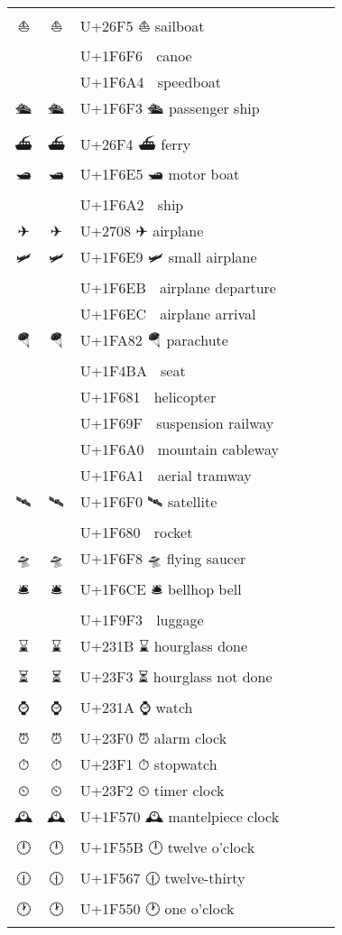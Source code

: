 \documentclass[a4paper,12pt]{ltjarticle}
\newcommand{\fontA}[1]{{\fontspec[RawFeature={mode=harf,+dist,+ccmp}]{Segoe UI Emoji} #1}}
\newcommand{\fontB}[1]{{\fontspec[RawFeature={mode=harf,+dist,+ccmp}]{Noto Color Emoji} #1}}
\begin{document}
\begin{longtable}[c]{ccp{0.8\linewidth}}
\fontA{⛵}&\fontB{⛵}&U+26F5 ⛵ sailboat\\
\fontA{🛶}&\fontB{🛶}&U+1F6F6 🛶 canoe\\
\fontA{🚤}&\fontB{🚤}&U+1F6A4 🚤 speedboat\\
\fontA{🛳}&\fontB{🛳}&U+1F6F3 🛳 passenger ship\\
\fontA{⛴}&\fontB{⛴}&U+26F4 ⛴ ferry\\
\fontA{🛥}&\fontB{🛥}&U+1F6E5 🛥 motor boat\\
\fontA{🚢}&\fontB{🚢}&U+1F6A2 🚢 ship\\
\fontA{✈}&\fontB{✈}&U+2708 ✈ airplane\\
\fontA{🛩}&\fontB{🛩}&U+1F6E9 🛩 small airplane\\
\fontA{🛫}&\fontB{🛫}&U+1F6EB 🛫 airplane departure\\
\fontA{🛬}&\fontB{🛬}&U+1F6EC 🛬 airplane arrival\\
\fontA{🪂}&\fontB{🪂}&U+1FA82 🪂 parachute\\
\fontA{💺}&\fontB{💺}&U+1F4BA 💺 seat\\
\fontA{🚁}&\fontB{🚁}&U+1F681 🚁 helicopter\\
\fontA{🚟}&\fontB{🚟}&U+1F69F 🚟 suspension railway\\
\fontA{🚠}&\fontB{🚠}&U+1F6A0 🚠 mountain cableway\\
\fontA{🚡}&\fontB{🚡}&U+1F6A1 🚡 aerial tramway\\
\fontA{🛰}&\fontB{🛰}&U+1F6F0 🛰 satellite\\
\fontA{🚀}&\fontB{🚀}&U+1F680 🚀 rocket\\
\fontA{🛸}&\fontB{🛸}&U+1F6F8 🛸 flying saucer\\
\fontA{🛎}&\fontB{🛎}&U+1F6CE 🛎 bellhop bell\\
\fontA{🧳}&\fontB{🧳}&U+1F9F3 🧳 luggage\\
\fontA{⌛}&\fontB{⌛}&U+231B ⌛ hourglass done\\
\fontA{⏳}&\fontB{⏳}&U+23F3 ⏳ hourglass not done\\
\fontA{⌚}&\fontB{⌚}&U+231A ⌚ watch\\
\fontA{⏰}&\fontB{⏰}&U+23F0 ⏰ alarm clock\\
\fontA{⏱}&\fontB{⏱}&U+23F1 ⏱ stopwatch\\
\fontA{⏲}&\fontB{⏲}&U+23F2 ⏲ timer clock\\
\fontA{🕰}&\fontB{🕰}&U+1F570 🕰 mantelpiece clock\\
\fontA{🕛}&\fontB{🕛}&U+1F55B 🕛 twelve o’clock\\
\fontA{🕧}&\fontB{🕧}&U+1F567 🕧 twelve-thirty\\
\fontA{🕐}&\fontB{🕐}&U+1F550 🕐 one o’clock\\

\end{longtable}
\end{document}
